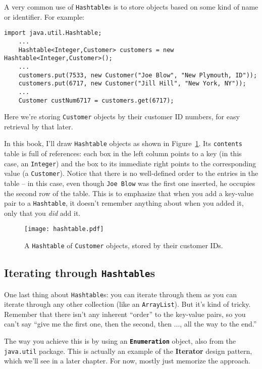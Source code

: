 A very common use of \texttt{Hashtable}s is to store objects based on some
kind of name or identifier. For example:

\begin{Verbatim}[fontsize=\footnotesize,samepage=true,frame=single]
    import java.util.Hashtable;
    ...
    Hashtable<Integer,Customer> customers = new Hashtable<Integer,Customer>();
    ...
    customers.put(7533, new Customer("Joe Blow", "New Plymouth, ID"));
    customers.put(6717, new Customer("Jill Hill", "New York, NY"));
    ...
    Customer custNum6717 = customers.get(6717);
\end{Verbatim}

Here we're storing \texttt{Customer} objects by their customer ID numbers, for
easy retrieval by that later.

In this book, I'll draw \texttt{Hashtable} objects as shown in
Figure~\ref{fig:hashtable}. Its \texttt{contents} table is full of references:
each box in the left column points to a key (in this case, an
\texttt{Integer}) and the box to its immediate right points to the
corresponding value (a \texttt{Customer}). Notice that there is no
well-defined order to the entries in the table -- in this case, even though
\texttt{Joe Blow} was the first one inserted, he occupies the second row of
the table. This is to emphasize that when you add a key-value pair to a
\texttt{Hashtable}, it doesn't remember anything about when you added it, only
that you \textit{did} add it.

\begin{figure}[ht]
\centering
\texttt{[image: hashtable.pdf]}
\caption{A \texttt{Hashtable} of \texttt{Customer} objects, stored by their
customer IDs.}
\label{fig:hashtable}
\end{figure}

\subsection{Iterating through \texttt{Hashtable}s}

One last thing about \texttt{Hashtable}s: you can iterate through them as you
can iterate through any other collection (like an \texttt{ArrayList}). But
it's kind of tricky. Remember that there isn't any inherent ``order'' to the
key-value pairs, so you can't say ``give me the first one, then the second,
then ..., all the way to the end.''

The way you achieve this is by using an \textbf{\texttt{Enumeration}} object,
also from the \texttt{java.util} package. This is actually an example of the
\textbf{Iterator} design pattern, which we'll see in a later chapter. For now,
mostly just memorize the approach.

